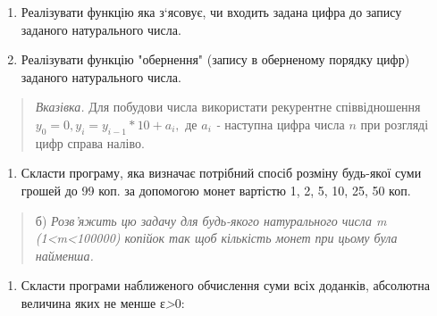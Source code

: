 \documentclass[]{article}
\begin{document}
\begin{enumerate}
\def\labelenumi{\arabic{enumi})}
\item
  Реалізувати функцію яка з`ясовує, чи входить задана цифра до запису
  заданого натурального числа.
\item
  Реалізувати функцію "обернення" (запису в оберненому порядку цифр)
  заданого натурального числа.
\end{enumerate}

\begin{quote}
\emph{Вказівка.} Для побудови числа використати рекурентне
співвідношення \(y_{0} = 0,y_{i} = y_{i - 1}*10 + a_{i},\) де \(a_{i}\)
\emph{-} наступна цифра числа \(n\) при розгляді цифр справа наліво.
\end{quote}

\begin{enumerate}
\def\labelenumi{\arabic{enumi})}
\item
  Скласти програму, яка визначає потрібний спосіб розміну будь-якої суми
  грошей до 99 коп. за допомогою монет вартістю 1, 2, 5, 10, 25, 50 коп.
\end{enumerate}

\begin{quote}
б) \emph{Розв'яжить цю задачу для будь-якого натурального числа m
(1\textless{}m\textless{}100000) копійок так щоб кількість монет при
цьому була найменша.}
\end{quote}

\begin{enumerate}
\def\labelenumi{\arabic{enumi})}
\item
  Скласти програми наближеного обчислення суми всіх доданків, абсолютна
  величина яких не менше ε\emph{\textgreater{}}0:
\end{enumerate}
\end{document}
